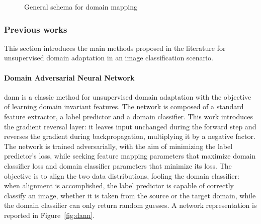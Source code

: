 \documentclass[%
    corpo=12pt,
    twoside,
    stile=classica,   
    tipotesi=magistrale,
    evenboxes,
    english,
	numerazioneromana,
]{toptesi}
\begin{document}
\begin{figure}[ht]
	\centering
	\caption{General schema for domain mapping\cite{wilson2020survey}}
	\label{fig:gan}
\end{figure}


\subsubsection{Previous works}
This section introduces the main methods proposed in the literature for unsupervised domain adaptation in an image classification scenario.

\paragraph{Domain Adversarial Neural Network}\label{sec:dann}
\gls{dann}\cite{ganin2015unsupervised} is a classic method for un\-su\-per\-vi\-sed domain adaptation with the objective of learning domain invariant features. The network is composed of a standard feature extractor, a label predictor and a domain classifier. This work introduces the gradient reversal layer: it leaves input unchanged during the forward step and reverses the gradient during backpropagation, multiplying it by a negative factor. The network is trained adversarially, with the aim of minimizing the label predictor’s loss, while seeking feature mapping parameters that maximize domain classifier loss and domain classifier parameters that minimize its loss. The objective is to align the two data distributions, fooling the domain classifier: when alignment is accomplished, the label predictor is capable of correctly classify an image, whether it is taken from the source or the target domain, while the domain classifier can only return random guesses. A network representation is reported in Figure~\ref{fig:dann}.
\end{document}
